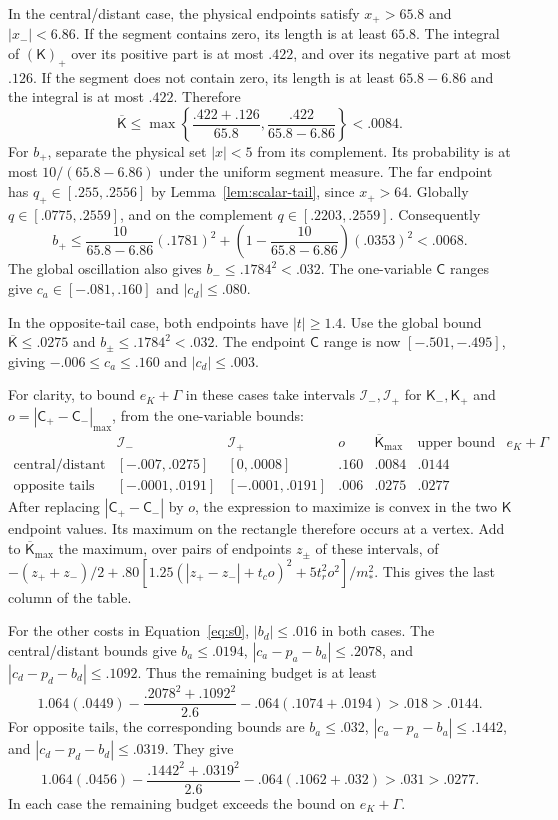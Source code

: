 In the central/distant case, the physical endpoints satisfy
$x_+>65.8$ and $|x_-|<6.86$. If the segment contains zero, its length
is at least $65.8$. The integral of $(\mathsf K)_+$ over its positive
part is at most $.422$, and over its negative part at most $.126$.
If the segment does not contain zero, its length is at least
$65.8-6.86$ and the integral is at most $.422$. Therefore
\[
 \overline{\mathsf K}
 \le\max\left\{\frac{.422+.126}{65.8},
                    \frac{.422}{65.8-6.86}\right\}<.0084.
\]
For $b_+$, separate the physical set $|x|<5$ from its complement.
Its probability is at most $10/(65.8-6.86)$ under the uniform
segment measure. The far endpoint has $q_+\in[.255,.2556]$ by
Lemma~\ref{lem:scalar-tail}, since $x_+>64$. Globally
$q\in[.0775,.2559]$, and on the complement $q\in[.2203,.2559]$.
Consequently
\[
 b_+\le\frac{10}{65.8-6.86}(.1781)^2
       +\left(1-\frac{10}{65.8-6.86}\right)(.0353)^2<.0068.
\]
The global oscillation also gives $b_-\le.1784^2<.032$.
The one-variable $\mathsf C$ ranges give
$c_a\in[-.081,.160]$ and $|c_d|\le.080$.

In the opposite-tail case, both endpoints have $|t|\ge1.4$.
Use the global bound $\overline{\mathsf K}\le.0275$ and
$b_\pm\le.1784^2<.032$. The endpoint $\mathsf C$ range is now
$[-.501,-.495]$, giving $-.006\le c_a\le.160$ and
$|c_d|\le.003$.

For clarity, to bound \(e_K+\Gamma\) in these cases take intervals \(\mathcal I_-,\mathcal I_+\) for \(\mathsf K_-,\mathsf K_+\) and \(o=|\mathsf C_+-\mathsf C_-|_{\max}\), from the one-variable bounds:
\[
 \begin{array}{c|ccc|cc}
 &\mathcal I_- &\mathcal I_+&o&\overline{\mathsf K}_{\max}
 &\text{upper bound on }e_K+\Gamma\\\hline
 \text{central/distant} &[-.007,.0275]&[0,.0008]&.160&.0084&.0144\\
 \text{opposite tails} &[-.0001,.0191]&[-.0001,.0191]&.006&.0275&.0277
 \end{array}
\]
After replacing $|\mathsf C_+-\mathsf C_-|$ by $o$, the expression to
maximize is convex in the two $\mathsf K$ endpoint values. Its maximum
on the rectangle therefore occurs at a vertex. Add to
$\overline{\mathsf K}_{\max}$ the maximum, over pairs of endpoints
$z_\pm$ of these intervals, of
$-(z_++z_-)/2+.80[1.25(|z_+-z_-|+t_co)^2+5t_r^2o^2]/m_*^2$.
This gives the last column of the table.

For the other costs in Equation~\eqref{eq:s0}, $|b_d|\le.016$ in
both cases. The central/distant bounds give
$b_a\le.0194$, $|c_a-p_a-b_a|\le.2078$, and
$|c_d-p_d-b_d|\le.1092$. Thus the remaining budget is at least
\[
 1.064(.0449)-\frac{.2078^2+.1092^2}{2.6}
              -.064(.1074+.0194)>.018>.0144.
\]
For opposite tails, the corresponding bounds are $b_a\le.032$,
$|c_a-p_a-b_a|\le.1442$, and $|c_d-p_d-b_d|\le.0319$.
They give
\[
 1.064(.0456)-\frac{.1442^2+.0319^2}{2.6}
              -.064(.1062+.032)>.031>.0277.
\]
In each case the remaining budget exceeds the bound on $e_K+\Gamma$.

